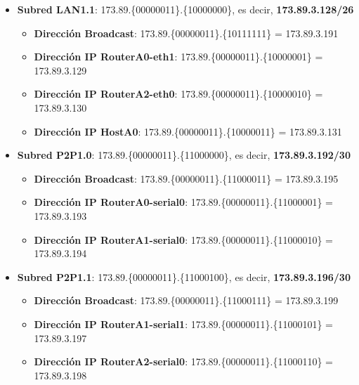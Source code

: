 \begin{itemize}
	\item{\textbf{Subred LAN1.1}:} 173.89.\{\textcolor{azul}{000000}\textcolor{rojo}{11}\}.\{\textcolor{rojo}{10}000000\}, es decir, \textbf{173.89.3.128/26}
		\begin{itemize}
			\item{\textbf{Dirección Broadcast}}: 173.89.\{\textcolor{azul}{000000}\textcolor{rojo}{11}\}.\{\textcolor{rojo}{10}111111\} = 173.89.3.191
			\item{\textbf{Dirección IP RouterA0-eth1}}: 173.89.\{\textcolor{azul}{000000}\textcolor{rojo}{11}\}.\{\textcolor{rojo}{10}000001\} = 173.89.3.129
			\item{\textbf{Dirección IP RouterA2-eth0}}: 173.89.\{\textcolor{azul}{000000}\textcolor{rojo}{11}\}.\{\textcolor{rojo}{10}000010\} = 173.89.3.130
			\item{\textbf{Dirección IP HostA0}}: 173.89.\{\textcolor{azul}{000000}\textcolor{rojo}{11}\}.\{\textcolor{rojo}{10}000011\} = 173.89.3.131
		\end{itemize}
	\item{\textbf{Subred P2P1.0}:} 173.89.\{\textcolor{azul}{000000}\textcolor{rojo}{11}\}.\{\textcolor{rojo}{110000}00\}, es decir, \textbf{173.89.3.192/30}
		\begin{itemize}
			\item{\textbf{Dirección Broadcast}}: 173.89.\{\textcolor{azul}{000000}\textcolor{rojo}{11}\}.\{\textcolor{rojo}{110000}11\} = 173.89.3.195
			\item{\textbf{Dirección IP RouterA0-serial0}}: 173.89.\{\textcolor{azul}{000000}\textcolor{rojo}{11}\}.\{\textcolor{rojo}{110000}01\} = 173.89.3.193
			\item{\textbf{Dirección IP RouterA1-serial0}}: 173.89.\{\textcolor{azul}{000000}\textcolor{rojo}{11}\}.\{\textcolor{rojo}{110000}10\} = 173.89.3.194
		\end{itemize}
	\item{\textbf{Subred P2P1.1}:} 173.89.\{\textcolor{azul}{000000}\textcolor{rojo}{11}\}.\{\textcolor{rojo}{110001}00\}, es decir, \textbf{173.89.3.196/30}
		\begin{itemize}
			\item{\textbf{Dirección Broadcast}}: 173.89.\{\textcolor{azul}{000000}\textcolor{rojo}{11}\}.\{\textcolor{rojo}{110001}11\} = 173.89.3.199
			\item{\textbf{Dirección IP RouterA1-serial1}}: 173.89.\{\textcolor{azul}{000000}\textcolor{rojo}{11}\}.\{\textcolor{rojo}{110001}01\} = 173.89.3.197
			\item{\textbf{Dirección IP RouterA2-serial0}}: 173.89.\{\textcolor{azul}{000000}\textcolor{rojo}{11}\}.\{\textcolor{rojo}{110001}10\} = 173.89.3.198

\end{itemize}
\end{itemize}
